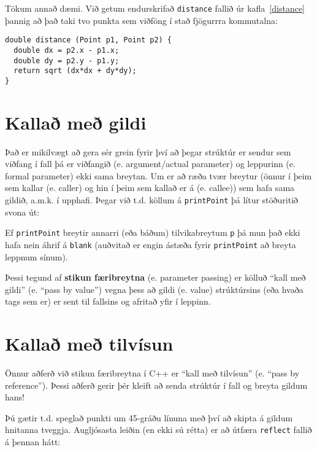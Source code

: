 Tökum annað dæmi.  Við getum endurskrifað {\tt distance} fallið úr kafla~\ref{distance} þannig að það taki tvo punkta sem viðföng í stað fjögurrra kommutalna:

\begin{verbatim}
double distance (Point p1, Point p2) {
  double dx = p2.x - p1.x;
  double dy = p2.y - p1.y;
  return sqrt (dx*dx + dy*dy);
}
\end{verbatim}

\section{Kallað með gildi}

Það er mikilvægt að gera sér grein fyrir því að þegar strúktúr er sendur sem viðfang í fall þá er viðfangið (e. argument/actual parameter) og leppurinn (e. formal parameter) ekki sama breytan.
Um er að ræða tvær breytur (önnur í þeim sem kallar (e. caller) og hin í þeim sem kallað er á (e. callee)) sem hafa sama gildið, a.m.k. í upphafi.
Þegar við t.d. köllum á {\tt printPoint} þá lítur stöðuritið svona út: 

\vspace{0.1in}
\centerline{}
\vspace{0.1in}
%
Ef {\tt printPoint} breytir annarri (eða báðum) tilvikabreytum {\tt p} þá mun það ekki hafa nein áhrif á {\tt blank} (auðvitað er engin ástæða fyrir {\tt printPoint} að breyta leppnum sínum).

Þessi tegund af {\bf stikun færibreytna} (e. parameter passing) er kölluð ``kall með gildi'' (e. ``pass by value'')
vegna þess að gildi (e. value) strúktúrsins (eða hvaða tags sem er) er sent til fallsins og afritað yfir í leppinn.

\section{Kallað með tilvísun}

Önnur aðferð við stikun færibreytna í C++ er ``kall með tilvísun'' (e. ``pass by reference'').
Þessi aðferð gerir þér kleift að senda strúktúr í fall og breyta gildum hans!

Þú gætir t.d. speglað punkti um 45-gráðu línuna með því að skipta á gildum hnitanna tveggja.
Augljósasta leiðin (en ekki sú rétta) er að útfæra {\tt reflect} fallið á þennan hátt:

